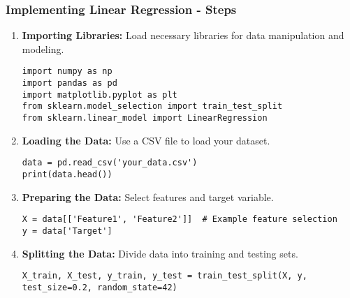 \documentclass[aspectratio=169]{beamer}
\begin{document}
\begin{frame}[fragile]
    \frametitle{Implementing Linear Regression - Steps}
    \begin{enumerate}
        \item \textbf{Importing Libraries:} Load necessary libraries for data manipulation and modeling.
        \begin{lstlisting}
import numpy as np
import pandas as pd
import matplotlib.pyplot as plt
from sklearn.model_selection import train_test_split
from sklearn.linear_model import LinearRegression
        \end{lstlisting}
        
        \item \textbf{Loading the Data:} Use a CSV file to load your dataset.
        \begin{lstlisting}
data = pd.read_csv('your_data.csv')
print(data.head())
        \end{lstlisting}
        
        \item \textbf{Preparing the Data:} Select features and target variable.
        \begin{lstlisting}
X = data[['Feature1', 'Feature2']]  # Example feature selection
y = data['Target']
        \end{lstlisting}
        
        \item \textbf{Splitting the Data:} Divide data into training and testing sets.
        \begin{lstlisting}
X_train, X_test, y_train, y_test = train_test_split(X, y, test_size=0.2, random_state=42)
        \end{lstlisting}
    \end{enumerate}
\end{frame}
\end{document}
